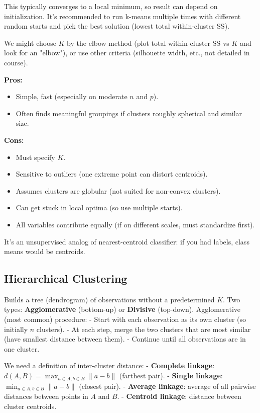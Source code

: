 \documentclass[11pt]{article}
\begin{document}
This typically converges to a local minimum, so result can depend on initialization. It's recommended to run k-means multiple times with different random starts and pick the best solution (lowest total within-cluster SS).

We might choose $K$ by the elbow method (plot total within-cluster SS vs $K$ and look for an "elbow"), or use other criteria (silhouette width, etc., not detailed in course).

\noindent \textbf{Pros:}
\begin{itemize}
    \item Simple, fast (especially on moderate $n$ and $p$).
    \item Often finds meaningful groupings if clusters roughly spherical and similar size.
\end{itemize}

\noindent \textbf{Cons:}
\begin{itemize}
    \item Must specify $K$.
    \item Sensitive to outliers (one extreme point can distort centroids).
    \item Assumes clusters are globular (not suited for non-convex clusters).
    \item Can get stuck in local optima (so use multiple starts).
    \item All variables contribute equally (if on different scales, must standardize first).
\end{itemize}

It’s an unsupervised analog of nearest-centroid classifier: if you had labels, class means would be centroids.

\subsection{Hierarchical Clustering}
Builds a tree (dendrogram) of observations without a predetermined $K$. Two types: \textbf{Agglomerative} (bottom-up) or \textbf{Divisive} (top-down).
Agglomerative (most common) procedure:
- Start with each observation as its own cluster (so initially $n$ clusters).
- At each step, merge the two clusters that are most similar (have smallest distance between them).
- Continue until all observations are in one cluster.

We need a definition of inter-cluster distance:
- \textbf{Complete linkage}: $d(A,B) = \max_{a \in A, b \in B} \|a-b\|$ (farthest pair).
- \textbf{Single linkage}: $\min_{a \in A, b \in B} \|a-b\|$ (closest pair).
- \textbf{Average linkage}: average of all pairwise distances between points in $A$ and $B$.
- \textbf{Centroid linkage}: distance between cluster centroids.
\end{document}
